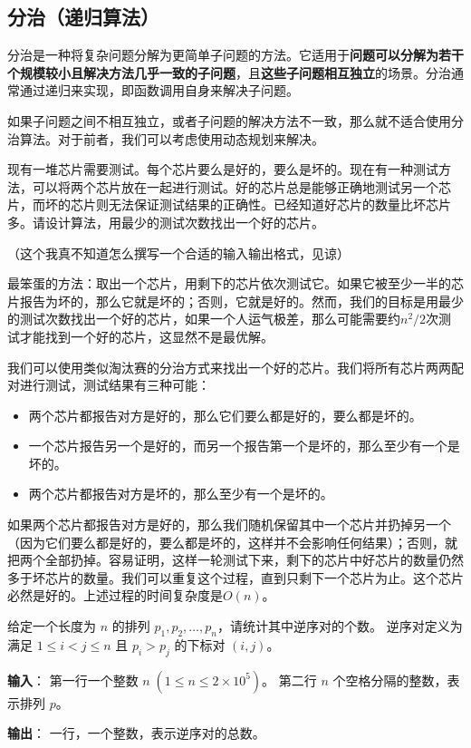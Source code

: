 \documentclass{article}
\begin{document}
\subsection{分治（递归算法）}

分治是一种将复杂问题分解为更简单子问题的方法。它适用于\textbf{问题可以分解为若干个规模较小且解决方法几乎一致的子问题}，且\textbf{这些子问题相互独立}的场景。分治通常通过递归来实现，即函数调用自身来解决子问题。

如果子问题之间不相互独立，或者子问题的解决方法不一致，那么就不适合使用分治算法。对于前者，我们可以考虑使用动态规划来解决。

\begin{example}
  现有一堆芯片需要测试。每个芯片要么是好的，要么是坏的。现在有一种测试方法，可以将两个芯片放在一起进行测试。好的芯片总是能够正确地测试另一个芯片，而坏的芯片则无法保证测试结果的正确性。已经知道好芯片的数量比坏芯片多。请设计算法，用最少的测试次数找出一个好的芯片。

  （这个我真不知道怎么撰写一个合适的输入输出格式，见谅）
\end{example}

\begin{soln}
  最笨蛋的方法：取出一个芯片，用剩下的芯片依次测试它。如果它被至少一半的芯片报告为坏的，那么它就是坏的；否则，它就是好的。然而，我们的目标是用最少的测试次数找出一个好的芯片，如果一个人运气极差，那么可能需要约$n^2/2$次测试才能找到一个好的芯片，这显然不是最优解。

  我们可以使用类似淘汰赛的分治方式来找出一个好的芯片。我们将所有芯片两两配对进行测试，测试结果有三种可能：
  \begin{itemize}
    \item 两个芯片都报告对方是好的，那么它们要么都是好的，要么都是坏的。
    \item 一个芯片报告另一个是好的，而另一个报告第一个是坏的，那么至少有一个是坏的。
    \item 两个芯片都报告对方是坏的，那么至少有一个是坏的。
  \end{itemize}

  如果两个芯片都报告对方是好的，那么我们随机保留其中一个芯片并扔掉另一个（因为它们要么都是好的，要么都是坏的，这样并不会影响任何结果）；否则，就把两个全部扔掉。容易证明，这样一轮测试下来，剩下的芯片中好芯片的数量仍然多于坏芯片的数量。我们可以重复这个过程，直到只剩下一个芯片为止。这个芯片必然是好的。上述过程的时间复杂度是$O(n)$。
\end{soln}

\begin{problem}
  给定一个长度为 $n$ 的排列 $p_1,p_2,\dots ,p_n$，请统计其中逆序对的个数。
  逆序对定义为满足 $1\le i<j\le n$ 且 $p_i>p_j$ 的下标对 $(i,j)$。

  \textbf{输入}：
  第一行一个整数 $n\;(1\le n\le 2\times 10^5)$。
  第二行 $n$ 个空格分隔的整数，表示排列 $p$。

  \textbf{输出}：
  一行，一个整数，表示逆序对的总数。
\end{problem}
\end{document}
